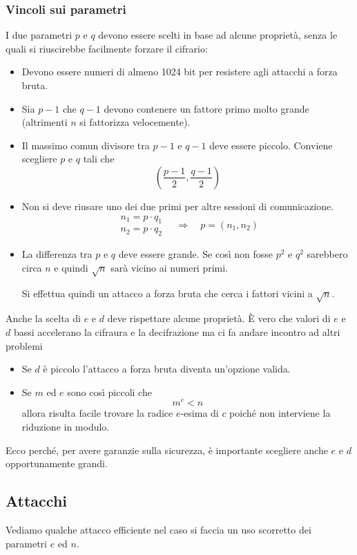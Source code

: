 \subsubsection{Vincoli sui parametri}
I due parametri $p$ e $q$ devono essere scelti in base ad alcune propriet\`a, senza le quali si riuscirebbe
facilmente forzare il cifrario:
\begin{itemize}
	\item Devono essere numeri di almeno 1024 bit per resistere agli attacchi a forza bruta.
	\item Sia $p-1$ che $q-1$ devono contenere un fattore primo molto grande (altrimenti $n$ si fattorizza
	      velocemente).
	\item Il massimo comun divisore tra $p-1$ e $q-1$ deve essere piccolo. Conviene scegliere $p$ e $q$ tali che
	      \[ \left( \frac{p-1}{2}, \frac{q-1}{2} \right) \]
	\item Non si deve riusare uno dei due primi per altre sessioni di comunicazione.
	      \[
		      \begin{matrix}
			      n_1 = p \cdot q_1 \\
			      n_2 = p \cdot q_2
		      \end{matrix}
		      \quad \Rightarrow \quad
		      p = (n_1, n_2)
	      \]
	\item La differenza tra $p$ e $q$ deve essere grande. Se cos\`i non fosse $p^2$ e $q^2$ sarebbero circa $n$ e
	      quindi $\sqrt{n}$ sar\`a vicino ai numeri primi.

	      Si effettua quindi un attacco a forza bruta che cerca i fattori vicini a $\sqrt{n}$.
\end{itemize}
Anche la scelta di $e$ e $d$ deve rispettare alcune propriet\`a. \`E vero che valori di $e$ e $d$ bassi accelerano
la cifraura e la decifrazione ma ci fa andare incontro ad altri problemi
\begin{itemize}
	\item Se $d$ \`e piccolo l'attacco a forza bruta diventa un'opzione valida.
	\item Se $m$ ed $e$ sono cos\`i piccoli che
	      \[ m^e < n \]
	      allora risulta facile trovare la radice $e$-esima di $c$ poich\'e non interviene la riduzione in modulo.
\end{itemize}
Ecco perch\'e, per avere garanzie sulla sicurezza, \`e importante scegliere anche $e$ e $d$ opportunamente grandi.

\subsection{Attacchi}
Vediamo qualche attacco efficiente nel caso si faccia un uso scorretto dei parametri $e$ ed $n$.


